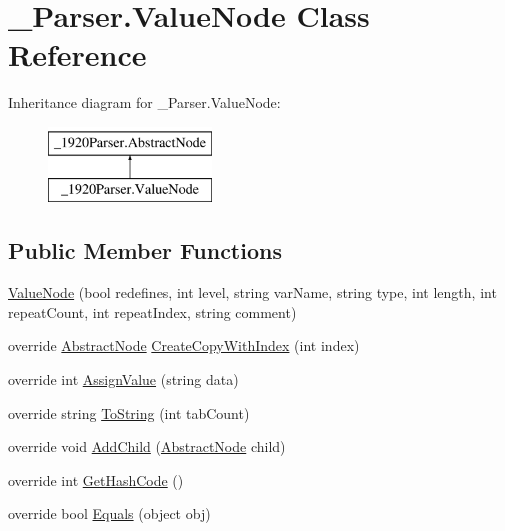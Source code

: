 \hypertarget{class__1920_parser_1_1_value_node}{}\section{\+\_\+Parser.\+Value\+Node Class Reference}
\label{class__1920_parser_1_1_value_node}
Inheritance diagram for \+\_\+Parser.\+Value\+Node\+:\begin{figure}[H]
\begin{center}
\leavevmode
\includegraphics[height=2.000000cm]{class__1920_parser_1_1_value_node}
\end{center}
\end{figure}
\subsection*{Public Member Functions}
\begin{DoxyCompactItemize}
\item 
\hyperlink{class__1920_parser_1_1_value_node_a5070c8591d364b184fb2f7a83098d1df}{Value\+Node} (bool redefines, int level, string var\+Name, string type, int length, int repeat\+Count, int repeat\+Index, string comment)
\item 
override \hyperlink{class__1920_parser_1_1_abstract_node}{Abstract\+Node} \hyperlink{class__1920_parser_1_1_value_node_a9419a8beace8e6eda482fc3a403daf4b}{Create\+Copy\+With\+Index} (int index)
\item 
override int \hyperlink{class__1920_parser_1_1_value_node_a21bed203f8124c630e8b804ebcd7b728}{Assign\+Value} (string data)
\item 
override string \hyperlink{class__1920_parser_1_1_value_node_ae2b512cbab33936e1b02d7a7acf3b4bd}{To\+String} (int tab\+Count)
\item 
override void \hyperlink{class__1920_parser_1_1_value_node_a035c2fb0a7af286a4718e7215b2925a1}{Add\+Child} (\hyperlink{class__1920_parser_1_1_abstract_node}{Abstract\+Node} child)
\item 
override int \hyperlink{class__1920_parser_1_1_value_node_a77ab8503cab6fa67bc948c6ac7bbff09}{Get\+Hash\+Code} ()
\item 
override bool \hyperlink{class__1920_parser_1_1_value_node_a748e3fdade8e115cc73babbe19646351}{Equals} (object obj)
\end{DoxyCompactItemize}
